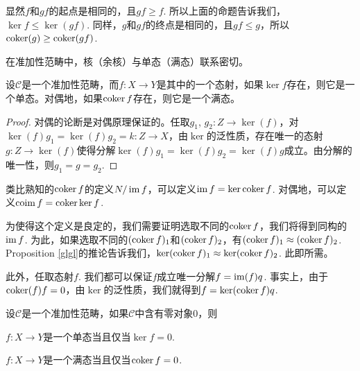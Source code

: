 \begin{para}[复合态射的核与余核]
显然$f$和$gf$的起点是相同的，且$gf\geq f$. 所以上面的命题告诉我们，$\ker f \leq \ker (gf)$. 同样，$g$和$gf$的终点是相同的，且$gf\leq g$，所以$\operatorname{coker}(g) \geq \operatorname{coker}(gf)$.
\end{para}

在准加性范畴中，核（余核）与单态（满态）联系密切。

\begin{lem}
设$\mathcal{C}$是一个准加性范畴，而$f:X\to Y$是其中的一个态射，如果$\ker f$存在，则它是一个单态。对偶地，如果$\operatorname{coker} f$存在，则它是一个满态。
\end{lem}

\begin{proof}
对偶的论断是对偶原理保证的。任取$g_1$, $g_2:Z\to \ker(f)$，对$\ker (f) g_1=\ker (f) g_2=k:Z\to X$，由$\ker$的泛性质，存在唯一的态射$g:Z\to \ker(f)$使得分解$\ker (f) g_1=\ker (f) g_2=\ker (f) g$成立。由分解的唯一性，则$g_1=g=g_2$.
\end{proof}



\begin{para}
类比熟知的$\operatorname{coker} f$的定义$N/\operatorname{im} f$，可以定义$\operatorname{im} f=\ker \operatorname{coker} f$. 对偶地，可以定义$\operatorname{coim} f=\operatorname{coker} \ker f$.
\end{para}

为使得这个定义是良定的，我们需要证明选取不同的$\operatorname{coker} f$，我们将得到同构的$\operatorname{im} f$. 为此，如果选取不同的$(\operatorname{coker} f)_1$和$(\operatorname{coker} f)_2$，有$(\operatorname{coker} f)_1\approx (\operatorname{coker} f)_2$. Proposition \ref{glgl}的推论告诉我们，$\ker (\operatorname{coker} f)_1\approx \ker (\operatorname{coker} f)_2$. 此即所需。

此外，任取态射$f$. 我们都可以保证$f$成立唯一分解$f=\operatorname{im}(f)q$. 事实上，由于$\operatorname{coker}(f)f=0$，由$\ker$的泛性质，我们就得到$f=\ker(\operatorname{coker} f)q$.

\begin{pro}
设$\mathcal{C}$是一个准加性范畴，如果$\mathcal{C}$中含有零对象$0$，则
\begin{compactenum}[~~~(1)]
\item $f:X\to Y$是一个单态当且仅当$\ker f=0$.
\item $f:X\to Y$是一个满态当且仅当$\operatorname{coker} f=0$.
\end{compactenum}
\end{pro}

